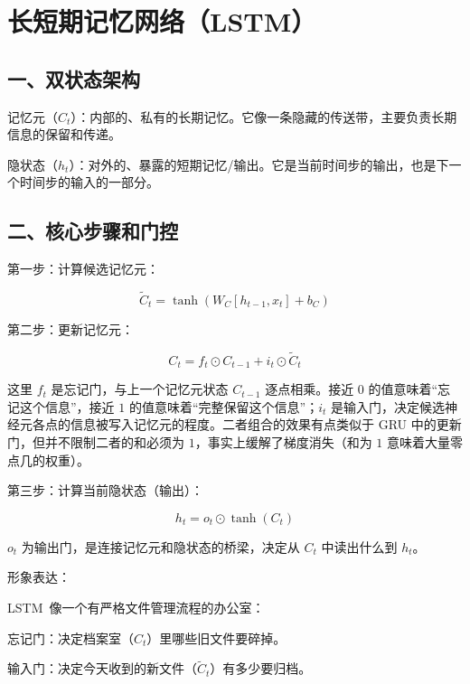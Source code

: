 \hypertarget{ux957fux77edux671fux8bb0ux5fc6ux7f51ux7edclstm}{%
\section{长短期记忆网络（LSTM）}\label{ux957fux77edux671fux8bb0ux5fc6ux7f51ux7edclstm}}

\hypertarget{ux4e00ux53ccux72b6ux6001ux67b6ux6784}{%
\subsection{一、双状态架构}\label{ux4e00ux53ccux72b6ux6001ux67b6ux6784}}

记忆元（\(C_t\)）：内部的、私有的长期记忆。它像一条隐藏的传送带，主要负责长期信息的保留和传递。

隐状态（\(h_t\)）：对外的、暴露的短期记忆/输出。它是当前时间步的输出，也是下一个时间步的输入的一部分。

\hypertarget{ux4e8cux6838ux5fc3ux6b65ux9aa4ux548cux95e8ux63a7}{%
\subsection{二、核心步骤和门控}\label{ux4e8cux6838ux5fc3ux6b65ux9aa4ux548cux95e8ux63a7}}

第一步：计算候选记忆元：

\[
\tilde{C}_t = \tanh(W_C [h_{t-1}, x_t] + b_C)
\]

第二步：更新记忆元：

\[
C_t = f_t \odot C_{t-1} + i_t \odot \tilde{C}_t
\]

这里 \(f_t\) 是忘记门，与上一个记忆元状态 \(C_{t-1}\) 逐点相乘。接近 \(0\) 的值意味着``忘记这个信息''，接近 \(1\) 的值意味着``完整保留这个信息''；\(i_t\) 是输入门，决定候选神经元各点的信息被写入记忆元的程度。二者组合的效果有点类似于 GRU 中的更新门，但并不限制二者的和必须为 \(1\)，事实上缓解了梯度消失（和为 \(1\) 意味着大量零点几的权重）。

第三步：计算当前隐状态（输出）：

\[
h_t = o_t \odot \tanh(C_t)
\]

\(o_t\) 为输出门，是连接记忆元和隐状态的桥梁，决定从 \(C_t\) 中读出什么到 \(h_t\)。

形象表达：

LSTM~像一个有严格文件管理流程的办公室：

忘记门：决定档案室（\(C_t\)）里哪些旧文件要碎掉。

输入门：决定今天收到的新文件（\(\tilde{C}_t\)）有多少要归档。

